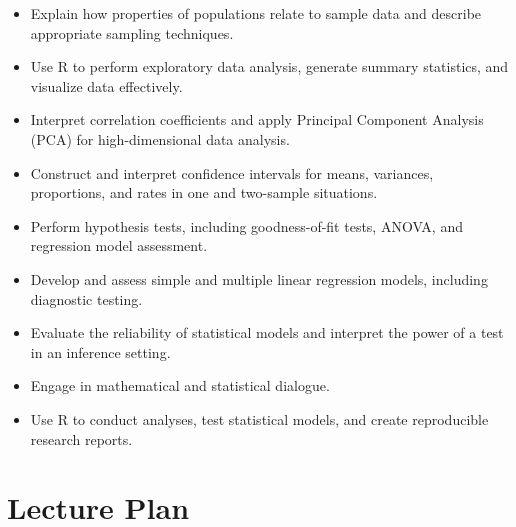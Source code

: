 \documentclass[
  a4paper,
  DIV=11,
  numbers=noendperiod,
  oneside]{scrreprt}
\providecommand{\tightlist}{%
  \setlength{\itemsep}{0pt}\setlength{\parskip}{0pt}}
\theoremstyle{plain}
\theoremstyle{definition}
\theoremstyle{definition}
\theoremstyle{definition}
\theoremstyle{plain}
\theoremstyle{remark}
\begin{document}
\begin{itemize}
\tightlist
\item
  Explain how properties of populations relate to sample data and
  describe appropriate sampling techniques.\\
\item
  Use R to perform exploratory data analysis, generate summary
  statistics, and visualize data effectively.\\
\item
  Interpret correlation coefficients and apply Principal Component
  Analysis (PCA) for high-dimensional data analysis.\\
\item
  Construct and interpret confidence intervals for means, variances,
  proportions, and rates in one and two-sample situations.\\
\item
  Perform hypothesis tests, including goodness-of-fit tests, ANOVA, and
  regression model assessment.\\
\item
  Develop and assess simple and multiple linear regression models,
  including diagnostic testing.\\
\item
  Evaluate the reliability of statistical models and interpret the power
  of a test in an inference setting.\\
\item
  Engage in mathematical and statistical dialogue.\\
\item
  Use R to conduct analyses, test statistical models, and create
  reproducible research reports.
\end{itemize}

\section*{Lecture Plan}\label{lecture-plan}

\end{document}

